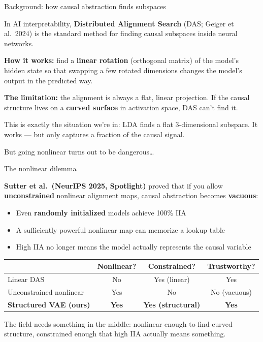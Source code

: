 \documentclass[aspectratio=169,11pt]{beamer}
\begin{document}
\begin{frame}{Background: how causal abstraction finds subspaces}

In AI interpretability, \textbf{Distributed Alignment Search} (DAS; Geiger et al.\ 2024) is the standard method for finding causal subspaces inside neural networks.

\vspace{0.5em}
\textbf{How it works:} find a \textbf{linear rotation} (orthogonal matrix) of the model's hidden state so that swapping a few rotated dimensions changes the model's output in the predicted way.

\vspace{0.5em}
\textbf{The limitation:} the alignment is always a flat, linear projection. If the causal structure lives on a \textbf{curved surface} in activation space, DAS can't find it.

\vspace{0.5em}
This is exactly the situation we're in: LDA finds a flat 3-dimensional subspace. It works --- but only captures a fraction of the causal signal.

\vspace{0.5em}
But going nonlinear turns out to be dangerous\ldots
\end{frame}

\begin{frame}{The nonlinear dilemma}

\textbf{Sutter et al.\ (NeurIPS 2025, Spotlight)} proved that if you allow \textbf{unconstrained} nonlinear alignment maps, causal abstraction becomes \textbf{vacuous}:

\vspace{0.3em}
\begin{itemize}\setlength\itemsep{2pt}
  \item Even \textbf{randomly initialized} models achieve 100\% IIA
  \item A sufficiently powerful nonlinear map can memorize a lookup table
  \item High IIA no longer means the model actually represents the causal variable
\end{itemize}

\vspace{0.5em}
{\small
\begin{tabular}{lccc}
\toprule
& \textbf{Nonlinear?} & \textbf{Constrained?} & \textbf{Trustworthy?} \\
\midrule
Linear DAS & No & Yes (linear) & Yes \\
Unconstrained nonlinear & Yes & No & No (vacuous) \\
\textbf{Structured VAE (ours)} & \textbf{Yes} & \textbf{Yes (structural)} & \textbf{Yes} \\
\bottomrule
\end{tabular}
}

\vspace{0.5em}
The field needs something in the middle: nonlinear enough to find curved structure, constrained enough that high IIA actually means something.
\end{frame}
\end{document}
